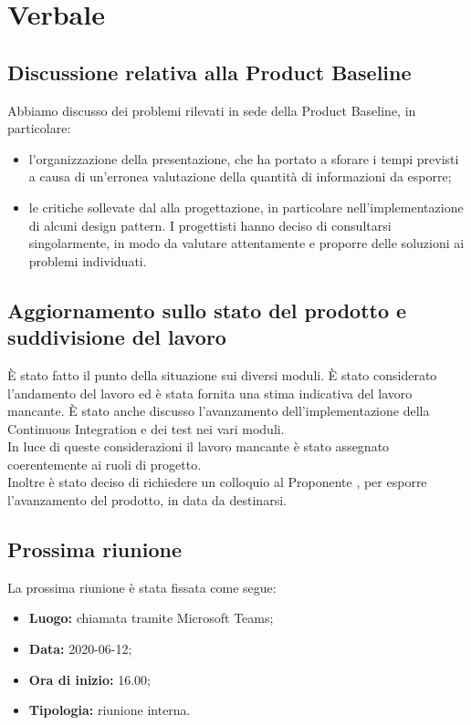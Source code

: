 \section{Verbale}
\subsection{Discussione relativa alla Product Baseline}
	Abbiamo discusso dei problemi rilevati in sede della Product Baseline, in particolare:
	\begin{itemize}
		\item l'organizzazione della presentazione, che ha portato a sforare i tempi previsti a causa di un'erronea valutazione della quantità di informazioni da esporre;
		\item le critiche sollevate dal \RC{} alla progettazione, in particolare nell'implementazione di alcuni design pattern. I progettisti hanno deciso di consultarsi singolarmente, in modo da valutare attentamente e proporre delle soluzioni ai problemi individuati.
	\end{itemize}
\subsection{Aggiornamento sullo stato del prodotto e suddivisione del lavoro}
È stato fatto il punto della situazione sui diversi moduli. È stato considerato l’andamento del lavoro ed è stata fornita una stima indicativa del lavoro mancante. È stato anche discusso l'avanzamento dell'implementazione della Continuous Integration e dei test nei vari moduli.\\ In luce di queste considerazioni il lavoro mancante è stato assegnato coerentemente ai ruoli di progetto.\\ Inoltre è stato deciso di richiedere un colloquio al Proponente \Proponente{}, per esporre l'avanzamento del prodotto, in data da destinarsi.
	\subsection{Prossima riunione}
		La prossima riunione è stata fissata come segue:
		\begin{itemize}
			\item \textbf{Luogo:} chiamata tramite Microsoft Teams;
			\item \textbf{Data:} 2020-06-12;
			\item \textbf{Ora di inizio:} 16.00;
			\item \textbf{Tipologia:} riunione interna.
		\end{itemize}

